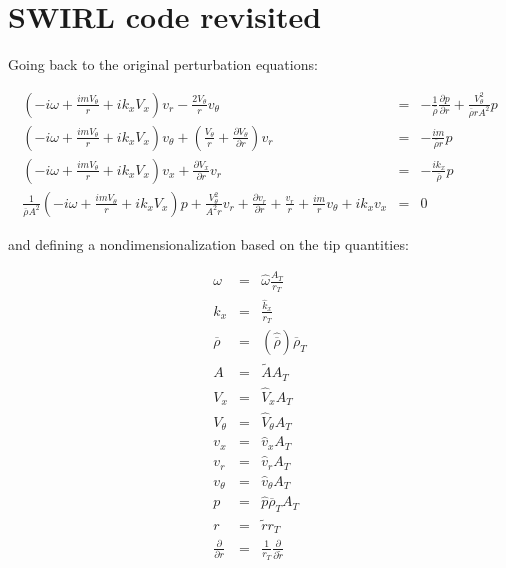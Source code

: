 \documentclass[12pt]{article}
\begin{document}
\section{SWIRL code revisited}

Going back to the original perturbation equations:

\begin{eqnarray}
\left(
-i \omega
+ \frac{i m V_{\theta}}{r}
+i k_x V_x 
\right) v_r
-\frac{2 V_{\theta}}{r} v_{\theta}
&=&
-\frac{1}{\overline{\rho}} \frac{\partial p}{\partial r}
+\frac{V_{\theta}^2}{\overline{\rho} r A^2} p
\nonumber
\\
\left(
-i \omega
+ \frac{i m V_{\theta}}{r}
+i k_x V_x 
\right) v_{\theta}
+
\left(
\frac{V_{\theta}}{r}
+\frac{\partial V_{\theta}}{\partial r}
\right) v_r
&=&
-\frac{i m}{\overline{\rho} r} p
\nonumber
\\
\left(
-i \omega
+ \frac{i m V_{\theta}}{r}
+i k_x V_x 
\right) v_x
+\frac{\partial V_x}{\partial r} v_r
&=&
-\frac{i k_x}{\overline{\rho}} p
\nonumber
\\
\frac{1}{ \overline{\rho} A^2}
\left(
-i \omega
+ \frac{i m V_{\theta}}{r} 
+ i k_x V_x 
\right) p
+\frac{V_{\theta}^2}{A^2 r}
v_r
+ 
\frac{\partial v_r}{\partial r}
+ 
\frac{v_r}{r} 
+\frac{i m }{r} v_{\theta} 
+ i k_x v_x
&=&
0
\nonumber
\end{eqnarray}

and defining a nondimensionalization based on the tip quantities:

\begin{eqnarray}
\omega &=& \widehat{\omega} \frac{A_T}{r_T}
\nonumber
\\
k_x &=& \frac{\widehat{k}_x}{ r_T}
\nonumber
\\
\overline{\rho} &=& 
\left(\widehat{\overline{\rho}} \right) \overline{\rho}_T
\nonumber
\\
A &=& \widetilde{A} A_T
\nonumber
\\
V_{x} &=& \widehat{V}_{x} A_T
\nonumber
\\
V_{\theta} &=& \widehat{V}_{\theta} A_T
\nonumber
\\
v_{x} &=& \widehat{v}_{x} A_T
\nonumber
\\
v_{r} &=& \widehat{v}_{r} A_T
\nonumber
\\
v_{\theta} &=& \widehat{v}_{\theta} A_T
\nonumber
\\
p &=& \widehat{p} \overline{\rho}_T A_T
\nonumber
\\
r &=& \widetilde{r} r_T
\nonumber
\\
\frac{\partial}{\partial r} &=& \frac{1}{r_T} \frac{\partial}{\partial \widetilde{r}}
\nonumber
\end{eqnarray}
\end{document}

